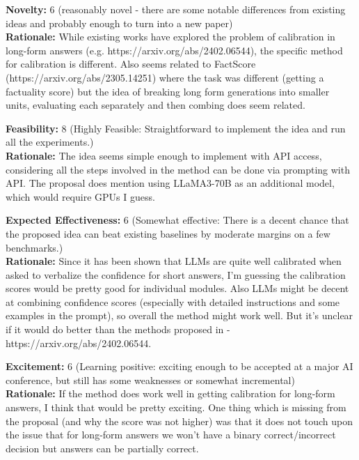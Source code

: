 \begin{tcolorbox}[colback=green!10!white, colframe=green!80!black, title=\textbf{Reviewer 2}]
\small
\textbf{Novelty:} 6 (reasonably novel - there are some notable differences from existing ideas and probably enough to turn into a new paper)\\
\textbf{Rationale:} While existing works have explored the problem of calibration in long-form answers (e.g. https://arxiv.org/abs/2402.06544), the specific method for calibration is different. Also seems related to FactScore (https://arxiv.org/abs/2305.14251) where the task was different (getting a factuality score) but the idea of breaking long form generations into smaller units, evaluating each separately and then combing does seem related.

\vspace{10pt}

\textbf{Feasibility:} 8 (Highly Feasible: Straightforward to implement the idea and run all the experiments.)\\
\textbf{Rationale:} The idea seems simple enough to implement with API access, considering all the steps involved in the method can be done via prompting with API. The proposal does mention using LLaMA3-70B as an additional model, which would require GPUs I guess.

\vspace{10pt}

\textbf{Expected Effectiveness:} 6 (Somewhat effective: There is a decent chance that the proposed idea can beat existing baselines by moderate margins on a few benchmarks.)\\
\textbf{Rationale:} Since it has been shown that LLMs are quite well calibrated when asked to verbalize the confidence for short answers, I'm guessing the calibration scores would be pretty good for individual modules. Also LLMs might be decent at combining confidence scores (especially with detailed instructions and some examples in the prompt), so overall the method might work well. But it's unclear if it would do better than the methods proposed in - https://arxiv.org/abs/2402.06544.

\vspace{10pt}

\textbf{Excitement:} 6 (Learning positive: exciting enough to be accepted at a major AI conference, but still has some weaknesses or somewhat incremental)\\
\textbf{Rationale:} If the method does work well in getting calibration for long-form answers, I think that would be pretty exciting. One thing which is missing from the proposal (and why the score was not higher) was that it does not touch upon the issue that for long-form answers we won't have a binary correct/incorrect decision but answers can be partially correct.


\end{tcolorbox}
